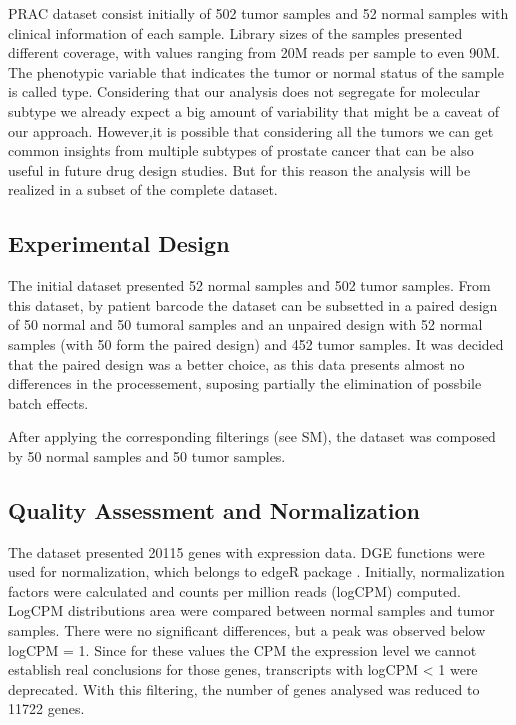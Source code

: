 \documentclass[9pt,twocolumn,twoside]{gsajnl}
\begin{document}
PRAC dataset consist initially of 502 tumor samples and 52 normal samples with clinical information of each sample. Library sizes of the samples presented different coverage, with values ranging from 20M reads per sample to even 90M.  The phenotypic variable that indicates the tumor or normal status of the sample is called type.  Considering that our analysis does not segregate for molecular subtype we already expect a big amount of variability that might be a caveat of our approach. However,it is possible that considering all the tumors we can get common insights from multiple subtypes of prostate cancer that can be also useful in future drug design studies. But for this reason the analysis will be realized in a subset of the complete dataset. 
\subsection*{Experimental Design}

The initial dataset presented 52 normal samples and 502 tumor samples. From this dataset, by patient barcode the dataset can be subsetted in a paired design of 50 normal and 50 tumoral samples and an unpaired design with 52 normal samples (with 50 form the paired design) and 452 tumor samples. It was decided that the paired design was a better choice, as this data presents almost no differences in the processement, suposing partially the elimination of possbile batch effects.

After applying the corresponding filterings (see SM), the dataset was composed by 50 normal samples and 50 tumor samples.

\subsection*{Quality Assessment and Normalization}

The dataset presented 20115 genes with expression data.  DGE functions were used for normalization, which belongs to edgeR package \cite{Robinson01012010}. Initially, normalization factors were calculated and counts per million reads (logCPM) computed. LogCPM distributions area were compared between normal samples and tumor samples. There were no significant differences, but a peak was observed below logCPM = 1. Since for these values the CPM the expression level we cannot establish real conclusions for those genes, transcripts with logCPM < 1 were deprecated. With this filtering, the number of genes analysed was reduced to 11722 genes. 
\end{document}
